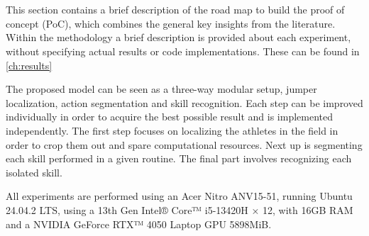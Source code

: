 
\chapter{}%
\label{ch:methodologie}


This section contains a brief description of the road map to build the proof of concept (PoC), which combines the general key insights from the literature. Within the methodology a brief description is provided about each experiment, without specifying actual results or code implementations. These can be found in \ref{ch:results}

The proposed model can be seen as a three-way modular setup, jumper localization, action segmentation and skill recognition.
Each step can be improved individually in order to acquire the best possible result and is implemented independently.
The first step focuses on localizing the athletes in the field in order to crop them out and spare computational resources. Next up is segmenting each skill performed in a given routine. The final part involves recognizing each isolated skill.

All experiments are performed using an Acer Nitro ANV15-51, running Ubuntu 24.04.2 LTS, using a 13th Gen Intel® Core™ i5-13420H × 12, with 16GB RAM and a NVIDIA GeForce RTX™ 4050 Laptop GPU 5898MiB.


